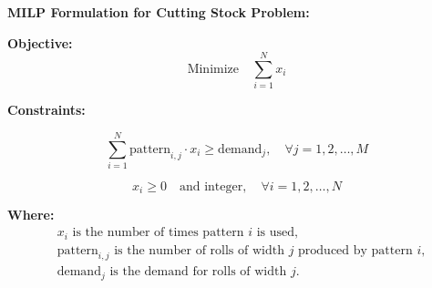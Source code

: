 \documentclass{article}
\begin{document}
\textbf{MILP Formulation for Cutting Stock Problem:}

\textbf{Objective:}
\[
\text{Minimize} \quad \sum_{i=1}^{N} x_i
\]

\textbf{Constraints:}

\[
\sum_{i=1}^{N} \text{pattern}_{i,j} \cdot x_i \geq \text{demand}_j, \quad \forall j = 1, 2, \ldots, M
\]

\[
x_i \geq 0 \quad \text{and integer}, \quad \forall i = 1, 2, \ldots, N
\]

\textbf{Where:}
\begin{align*}
& x_i \text{ is the number of times pattern } i \text{ is used,}\\
& \text{pattern}_{i,j} \text{ is the number of rolls of width } j \text{ produced by pattern } i,\\
& \text{demand}_j \text{ is the demand for rolls of width } j.
\end{align*}
\end{document}
